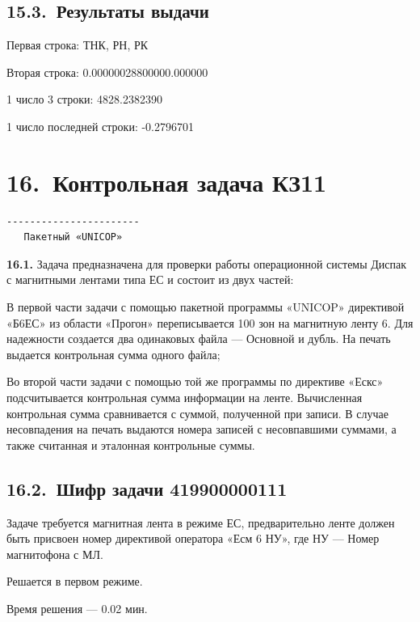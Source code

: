 \documentclass[11pt,a4paper]{article}
\begin{document}
\subsection*{15.3.~Результаты выдачи}
Первая строка: ТНК, РН, РК

Вторая строка: 0.00000028800000.000000

1 число 3 строки: 4828.2382390

1 число последней строки: -0.2796701

\section*{16.~Контрольная задача КЗ11}
\begin{center}\small
\begin{BVerbatim}
-----------------------
   Пакетный «UNICOP»
\end{BVerbatim}
\end{center}

\par\textbf{16.1.} Задача предназначена для проверки работы операционной системы Диспак с магнитными лентами типа ЕС и состоит из двух частей:\par
В первой части задачи с помощью пакетной программы «UNICOP» директивой «Б6ЕС» из области «Прогон» переписывается 100 зон на магнитную ленту 6. Для надежности создается два одинаковых файла --- Основной и дубль. На печать выдается контрольная сумма одного файла;

Во второй части задачи с помощью той же программы по директиве «Ескс» подсчитывается контрольная сумма информации на ленте. Вычисленная контрольная сумма сравнивается с суммой, полученной при записи. В случае несовпадения на печать выдаются номера записей с несовпавшими суммами, а также считанная и эталонная контрольные суммы.

\subsection*{16.2.~Шифр задачи 419900000111}
Задаче требуется магнитная лента в режиме ЕС, предварительно ленте должен быть присвоен номер директивой оператора «Есм 6 НУ», где НУ --- Номер магнитофона с МЛ.

Решается в первом режиме.

Время решения --- 0.02 мин.
\end{document}
